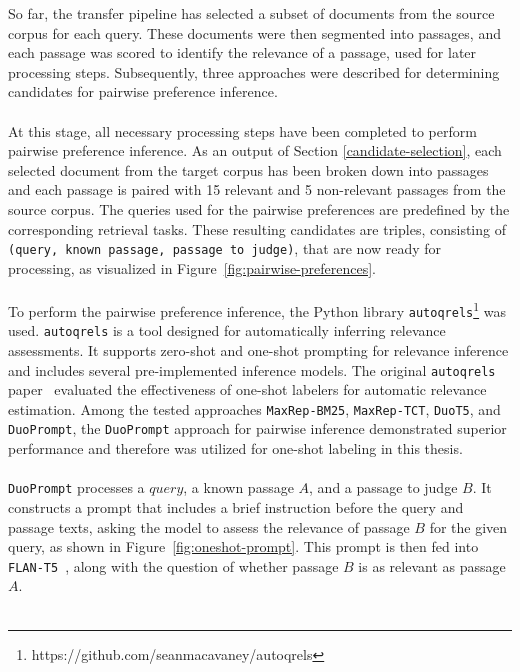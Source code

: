 So far, the transfer pipeline has selected a subset of documents from the source corpus for each query. These documents were then segmented into passages, and each passage was scored to identify the relevance of a passage, used for later processing steps. Subsequently, three approaches were described for determining candidates for pairwise preference inference.
\\\\
At this stage, all necessary processing steps have been completed to perform pairwise preference inference. As an output of Section \ref{candidate-selection}, each selected document from the target corpus has been broken down into passages and each passage is paired with 15 relevant and 5 non-relevant passages from the source corpus. The queries used for the pairwise preferences are predefined by the corresponding retrieval tasks. These resulting candidates are triples, consisting of \texttt{(query, known passage, passage to judge)}, that are now ready for processing, as visualized in Figure~\ref{fig:pairwise-preferences}.
\\\\
To perform the pairwise preference inference, the Python library \texttt{autoqrels}\footnote{https://github.com/seanmacavaney/autoqrels} was used. \texttt{autoqrels} is a tool designed for automatically inferring relevance assessments. It supports zero-shot and one-shot prompting for relevance inference and includes several pre-implemented inference models. The original \texttt{autoqrels} paper~\citep{macavaney:2023} evaluated the effectiveness of one-shot labelers for automatic relevance estimation. Among the tested approaches \texttt{MaxRep-BM25}, \texttt{MaxRep-TCT}, \texttt{DuoT5}, and \texttt{DuoPrompt}, the \texttt{DuoPrompt} approach for pairwise inference demonstrated superior performance and therefore was utilized for one-shot labeling in this thesis.
\\\\
\texttt{DuoPrompt} processes a $query$, a known passage $A$, and a passage to judge $B$. It constructs a prompt that includes a brief instruction before the query and passage texts, asking the model to assess the relevance of passage $B$ for the given query, as shown in Figure~\ref{fig:oneshot-prompt}. This prompt is then fed into \mbox{\texttt{FLAN-T5}~\citep{chung:2022}}, along with the question of whether passage $B$ is as relevant as passage $A$.
\\\\
